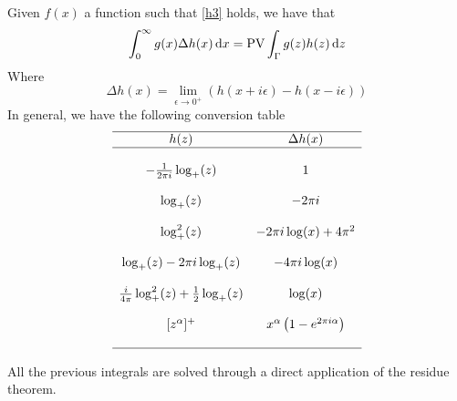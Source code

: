 \documentclass[../complete.tex]{subfiles}
\begin{document}
\begin{thm}
	Given $f(x)$ a function such that \eqref{h3} holds, we have that
	\begin{equation}
		\int_{0}^{\infty}g(x)\Delta h(x)\operatorname{d\!} x=\operatorname{\mathrm{PV}}\int_{\Gamma}^{}g(z)h(z)\operatorname{d\!} z
		\label{eq:intpac}
	\end{equation}
	Where
	\begin{equation}
		\Delta h(x)=\lim_{\epsilon\to0^+}\left( h(x+i\epsilon)-h(x-i\epsilon) \right)
		\label{eq:deltahdefcesi}
	\end{equation}
	In general, we have the following conversion table
	\begin{equation}
		\begin{matrix}
			\hline
			h(z)&\Delta h(x)\\
			\hline\\
			-\frac{1}{2\pi i}\log_+(z)&1\\\\
			\log_+(z)&-2\pi i\\\\
			\log_+^2(z)&-2\pi i\log(x)+4\pi^2\\\\
			\log_+(z)-2\pi i\log_+(z)&-4\pi i\log(x)\\\\
			\frac{i}{4\pi}\log_+^2(z)+\frac{1}{2}\log_+(z)&\log(x)\\\\
			[z^\alpha]^+&x^\alpha\left( 1-e^{2\pi i\alpha} \right)\\\\
			\hline
		\end{matrix}
		\label{eq:tableconv}
	\end{equation}
\end{thm}
All the previous integrals are solved through a direct application of the residue theorem.
\end{document}
